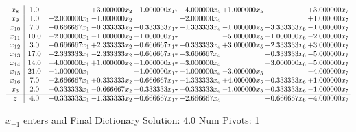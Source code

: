 \documentclass[10pt]{article}
\begin{document}
 \[\begin{array}{c| c c@{\hskip 2pt} c@{\hskip 2pt} c@{\hskip 2pt} c@{\hskip 2pt} c@{\hskip 2pt} c@{\hskip 2pt} c@{\hskip 2pt} }
 x_{8}   &  1.0  &   & + 3.000000 x_{2} & + 1.000000 x_{17} & + 4.000000 x_{4} & + 1.000000 x_{5} &   & + 3.000000 x_{7}\\
 x_{9}   &  1.0 & + 2.000000 x_{1} & -1.000000 x_{2} &   & + 2.000000 x_{4} &    &   & + 1.000000 x_{7}\\
 x_{10}   &  7.0 & + 0.666667 x_{1} & -0.333333 x_{2} & + 0.333333 x_{17} & + 1.333333 x_{4} & -1.000000 x_{5} & + 3.333333 x_{6} & -1.000000 x_{7}\\
 x_{11}   &  10.0 & -2.000000 x_{1} & -1.000000 x_{2} & -1.000000 x_{17} &   & -5.000000 x_{5} & + 1.000000 x_{6} & -2.000000 x_{7}\\
 x_{12}   &  3.0 & -0.666667 x_{1} & + 2.333333 x_{2} & + 0.666667 x_{17} & -0.333333 x_{4} & + 3.000000 x_{5} & -2.333333 x_{6} & + 3.000000 x_{7}\\
 x_{13}   &  17.0 & -2.333333 x_{1} & -2.333333 x_{2} & -0.666667 x_{17} & -3.666667 x_{4} &   & + 0.333333 x_{6} & -5.000000 x_{7}\\
 x_{14}   &  14.0 & + 4.000000 x_{1} & + 1.000000 x_{2} & -1.000000 x_{17} & -3.000000 x_{4} &   & -3.000000 x_{6} & -5.000000 x_{7}\\
 x_{15}   &  21.0 & -1.000000 x_{1} &   & -1.000000 x_{17} & + 1.000000 x_{4} & -3.000000 x_{5} &   & -4.000000 x_{7}\\
 x_{16}   &  7.0 & -2.666667 x_{1} & + 0.333333 x_{2} & + 0.666667 x_{17} & -1.333333 x_{4} & + 4.000000 x_{5} & -0.333333 x_{6} & + 1.000000 x_{7}\\
 x_{3}   &  2.0 & + 0.333333 x_{1} & -0.666667 x_{2} & -0.333333 x_{17} & -0.333333 x_{4} & -1.000000 x_{5} & -0.333333 x_{6} & -1.000000 x_{7}\\
\hline
z    &  4.0 & -0.333333 x_{1} & -1.333333 x_{2} & -0.666667 x_{17} & -2.666667 x_{4} &   & -0.666667 x_{6} & -4.000000 x_{7}\\
\end{array}\]


 $ x_{-1} $ enters and Final Dictionary
Solution:  4.0
Num Pivots:  1
\end{document}

